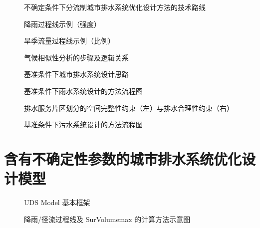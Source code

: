 \documentclass[degree=doctor]{sysuthesis}
\begin{document}
\clearpage
\setcounter{page}{43}
\begin{figure}
  \centering
  \caption{不确定条件下分流制城市排水系统优化设计方法的技术路线}
\end{figure}

\clearpage
\setcounter{page}{49}
\begin{figure}
  \centering
  \caption{降雨过程线示例（强度）}
\end{figure}

\begin{figure}
  \centering
  \caption{旱季流量过程线示例（比例）}
\end{figure}

\clearpage
\setcounter{page}{52}
\begin{figure}
  \centering
  \caption{气候相似性分析的步骤及逻辑关系}
\end{figure}

\clearpage
\setcounter{page}{53}
\begin{figure}
  \centering
  \caption{基准条件下城市排水系统设计思路}
\end{figure}

\clearpage
\setcounter{page}{54}
\begin{figure}
  \centering
  \caption{基准条件下雨水系统设计的方法流程图}
\end{figure}

\clearpage
\setcounter{page}{56}
\begin{figure}
  \centering
  \caption{排水服务片区划分的空间完整性约束（左）与排水合理性约束（右）}
\end{figure}

\clearpage
\setcounter{page}{58}
\begin{figure}
  \centering
  \caption{基准条件下污水系统设计的方法流程图}
\end{figure}


\chapter{含有不确定性参数的城市排水系统优化设计模型}

\clearpage
\setcounter{page}{66}
\begin{figure}
  \centering
  \caption{UDS Model 基本框架}
\end{figure}

\clearpage
\setcounter{page}{82}
\begin{figure}
  \centering
  \caption{降雨/径流过程线及 SurVolumemax 的计算方法示意图}
\end{figure}
\end{document}
